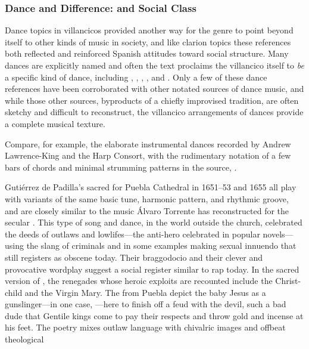\subsubsection{Dance and Difference:  and Social Class}

Dance topics in villancicos provided another way for the genre to point beyond
itself to other kinds of music in society, and like clarion topics these
references both reflected and reinforced Spanish attitudes toward social
structure.
Many dances are explicitly named and often the text proclaims the villancico
itself to \emph{be} a specific kind of dance, including ,
, , , and
.%
    \citXXX[sources]
Only a few of these dance references have been corroborated with other notated
sources of dance music, and while those other sources, byproducts of a chiefly
improvised tradition, are often sketchy and difficult to reconstruct, the
villancico arrangements of dances provide a complete musical texture.%
\begin{Footnote}
    Compare, for example, the elaborate instrumental dances recorded by Andrew
    Lawrence-King and the Harp Consort, 
    with the rudimentary notation of a few bars of chords and minimal strumming
    patterns in the source, .
\end{Footnote}
Gutiérrez de Padilla's sacred  for Puebla Cathedral in 1651--53
and 1655 all play with variants of the same basic tune, harmonic pattern, and
rhythmic groove, and are closely similar to the music Álvaro Torrente has
reconstructed for the secular .%
This type of song and dance, in the world outside the church, celebrated the
deeds of outlaws and lowlifes---the anti-hero  celebrated in
popular novels---using the slang of criminals and in some examples making
sexual innuendo that still registers as obscene today.
Their braggodocio and their clever and provocative wordplay suggest a social
register similar to rap today.
In the sacred version of , the renegades whose heroic exploits
are recounted include the Christ-child and the Virgin Mary.
The  from Puebla depict the baby Jesus as a gunslinger---in one
case, ---here to finish off a feud with the devil,
such a bad dude that Gentile kings come to pay their respects and throw gold
and incense at his feet.
The poetry mixes outlaw language with chivalric images and offbeat theological
